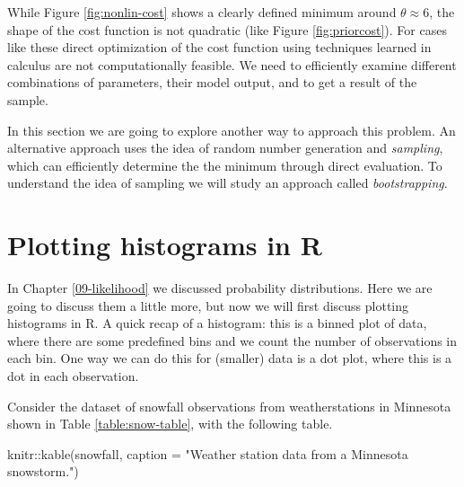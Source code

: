 \documentclass[
]{book}
\newenvironment{Shaded}{\begin{snugshade}}{\end{snugshade}}
\newcommand{\AttributeTok}[1]{\textcolor[rgb]{0.77,0.63,0.00}{#1}}
\newcommand{\FunctionTok}[1]{\textcolor[rgb]{0.00,0.00,0.00}{#1}}
\newcommand{\NormalTok}[1]{#1}
\newcommand{\SpecialCharTok}[1]{\textcolor[rgb]{0.00,0.00,0.00}{#1}}
\newcommand{\StringTok}[1]{\textcolor[rgb]{0.31,0.60,0.02}{#1}}
\theoremstyle{definition}
\theoremstyle{definition}
\theoremstyle{definition}
\theoremstyle{remark}
\begin{document}
While Figure \ref{fig:nonlin-cost} shows a clearly defined minimum around \(\theta \approx 6\), the shape of the cost function is not quadratic (like Figure \ref{fig:priorcost}). For cases like these direct optimization of the cost function using techniques learned in calculus are not computationally feasible. We need to efficiently examine different combinations of parameters, their model output, and to get a result of the sample.

In this section we are going to explore another way to approach this problem. An alternative approach uses the idea of random number generation and \emph{sampling}, which can efficiently determine the the minimum through direct evaluation. To understand the idea of sampling we will study an approach called \emph{bootstrapping}.

\hypertarget{plotting-histograms-in-r}{%
\section{Plotting histograms in R}\label{plotting-histograms-in-r}}

In Chapter \ref{09-likelihood} we discussed probability distributions. Here we are going to discuss them a little more, but now we will first discuss plotting histograms in R. A quick recap of a histogram: this is a binned plot of data, where there are some predefined bins and we count the number of observations in each bin. One way we can do this for (smaller) data is a dot plot, where this is a dot in each observation.

Consider the dataset of snowfall observations from weatherstations in Minnesota shown in Table \ref{table:snow-table}, with the following table.

\begin{Shaded}
\begin{Highlighting}[]
\NormalTok{knitr}\SpecialCharTok{::}\FunctionTok{kable}\NormalTok{(snowfall, }\AttributeTok{caption =} \StringTok{"Weather station data from a Minnesota snowstorm."}\NormalTok{)}
\end{Highlighting}
\end{Shaded}
\end{document}
